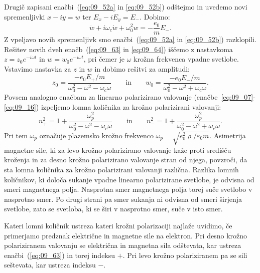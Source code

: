 Drugič zapisani enačbi~(\ref{eq:09_52a} in \ref{eq:09_52b})
odštejmo in uvedemo novi spremenljivki $x-iy=w$ ter $E_x-iE_y = E_-$.
Dobimo:
\begin{equation}
\ddot{w} +i \omega_{c}\dot{w} + \omega_0^2 w = -\frac{e_0}{m}E_-.
\label{eq:09_64}
\end{equation}
Z vpeljavo novih spremenljivk smo enačbi~(\ref{eq:09_52a} in \ref{eq:09_52b}) razklopili. 
Rešitev novih dveh enačb~(\ref{eq:09_63} in \ref{eq:09_64}) 
iščemo z nastavkoma $z = z_0 e^{-i\omega t}$ in $w = w_0 e^{-i\omega t}$, pri čemer
je $\omega$ krožna frekvenca vpadne svetlobe. Vstavimo nastavka za $z$ in $w$ in dobimo rešitvi za amplitudi:
\begin{equation}
z_0 = \frac{-e_0 E_+/m}{\omega_0^2 - \omega^2 - \omega_{c}\omega} \qquad \mathrm{in} \qquad 
w_0 = \frac{-e_0 E_-/m}{\omega_0^2 - \omega^2 + \omega_{c}\omega}.
\label{eq:09_65}
\end{equation}
Povsem analogno enačbam za linearno polarizirano 
valovanje (enačbe~\ref{eq:09_07}-\ref{eq:09_16}) izpeljemo lomna količnika za krožno polarizirani valovanji:
\begin{equation}
n_+^2 = 1 + \frac{\omega_p^2}{\omega_0^2 -\omega^2 - \omega_{c}\omega} \qquad \mathrm{in}
\qquad 
n_-^2 = 1 + \frac{\omega_p^2}{\omega_0^2 -\omega^2 + \omega_{c}\omega}.
\label{eq:09_66}
\end{equation}
Pri tem $\omega_p$ označuje plazemsko krožno
frekvenco $\omega_p = \sqrt{e_0^2 \varrho/\varepsilon_0 m}$. 
Asimetrija magnetne sile, ki za levo krožno polarizirano valovanje kaže proti
središču kroženja in za desno krožno polarizirano valovanje stran od njega, 
povzroči, da sta lomna količnika za krožno polarizirani valovanji različna. 
Razlika lomnih količnikov, ki določa sukanje vpadne linearno polarizirane svetlobe,
je odvisna od smeri magnetnega polja. Nasprotna smer magnetnega polja torej suče svetlobo
v nasprotno smer. Po drugi strani pa smer sukanja ni odvisna od smeri širjenja svetlobe, 
zato se svetloba, ki se širi v nasprotno smer, suče v isto smer.

Kateri lomni količnik ustreza kateri krožni polarizaciji najlaže uvidimo, če primerjamo
predznak električne in magnetne sile na elektron. Pri desno krožno polariziranem 
valovanju se električna in magnetna sila odštevata, kar ustreza enačbi~(\ref{eq:09_63})
in torej indeksu $+$. Pri levo krožno polariziranem pa se sili seštevata, kar ustreza
indeksu $-$.

